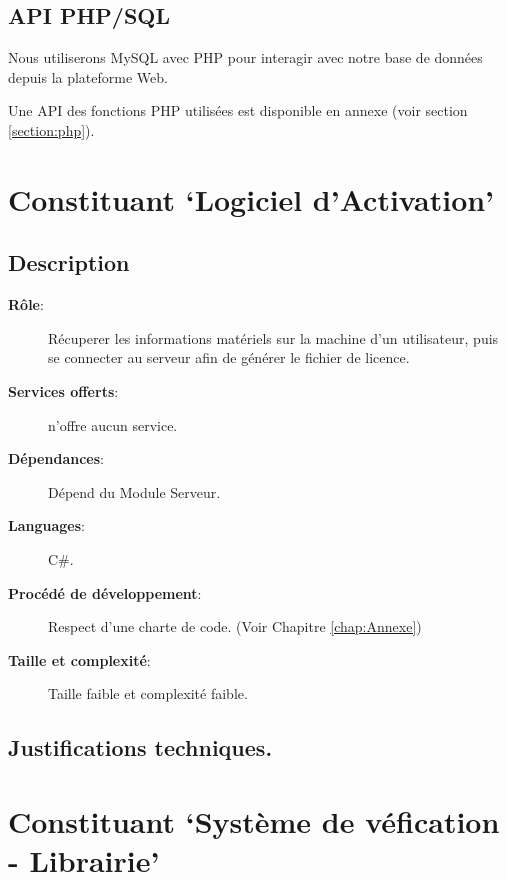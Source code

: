 \subsection{API PHP/SQL}
Nous utiliserons MySQL avec PHP pour interagir avec notre base de données depuis la plateforme Web.

Une API des fonctions PHP utilisées est disponible en annexe (voir section \ref{section:php}).


\section{Constituant `Logiciel d'Activation'}
\subsection{Description}
\begin{description}
	\item[\textbf{Rôle}:]
		Récuperer les informations matériels sur la machine d'un utilisateur, puis 
		se connecter au serveur afin de générer le fichier de licence.
	\item[\textbf{Services offerts}:] 
		n'offre aucun service.
	\item[\textbf{Dépendances}:]
		Dépend du Module Serveur.
	\item[\textbf{Languages}:]
		C\#.
	\item[\textbf{Procédé de développement}:]
		Respect d'une charte de code. (Voir Chapitre \ref{chap:Annexe})
	\item[\textbf{Taille et complexité}:]
		Taille faible et complexité faible. 
\end{description}

\subsection{Justifications techniques.}

\section{Constituant `Système de véfication - Librairie'}
